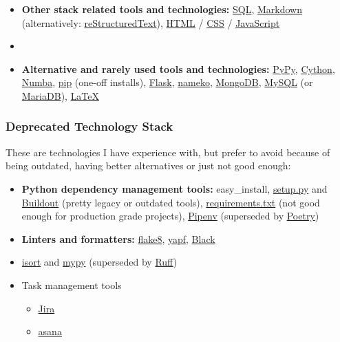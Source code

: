 \documentclass[a4paper,8pt]{extarticle}
\begin{document}
\begin{itemize}
    \item \textbf{Other stack related tools and technologies:} \href{https://en.wikipedia.org/wiki/SQL}{SQL}, \href{https://www.markdownguide.org/}{Markdown} (alternatively: \href{https://docutils.sourceforge.io/rst.html}{reStructuredText}), \href{https://www.w3.org/TR/2011/WD-html5-20110405/}{HTML} / \href{https://www.w3.org/Style/CSS/specs.en.html}{CSS} / \href{https://developer.mozilla.org/en-US/docs/Web/JavaScript}{JavaScript}
    \item \item \textbf{Alternative and rarely used tools and technologies:} \href{https://pypy.org/}{PyPy}, \href{https://cython.org/}{Cython}, \href{https://numba.pydata.org/}{Numba}, \href{https://pypi.org/project/pip/}{pip} (one-off installs), \href{https://flask.palletsprojects.com/}{Flask}, \href{https://www.nameko.io/}{nameko}, \href{https://www.mongodb.com/}{MongoDB}, \href{https://www.mysql.com/}{MySQL} (or \href{https://mariadb.org/}{MariaDB}), \href{https://www.latex-project.org/}{LaTeX}
\end{itemize}
\subsubsection{Deprecated Technology Stack}
These are technologies I have experience with, but prefer to avoid because of being outdated, having better alternatives or just not good enough:
\begin{itemize}
    \item \textbf{Python dependency management tools:} easy\_install, \href{https://packaging.python.org/en/latest/guides/distributing-packages-using-setuptools/#setup-py}{setup.py} and \href{https://www.buildout.org/}{Buildout} (pretty legacy or outdated tools), \href{https://pip.pypa.io/en/stable/reference/requirements-file-format/}{requirements.txt} (not good enough for production grade projects), \href{https://pypi.org/project/pipenv/}{Pipenv} (superseded by \href{https://python-poetry.org/}{Poetry})
    \item \textbf{Linters and formatters:}  \href{https://flake8.pycqa.org/}{flake8}, \href{https://github.com/google/yapf}{yapf}, \href{https://black.readthedocs.io/}{Black} \item \href{https://pycqa.github.io/isort/}{isort} and  \href{https://mypy-lang.org/}{mypy} (superseded by \href{https://docs.astral.sh/ruff/}{Ruff})
\end{itemize}
\begin{itemize}
    \item Task management tools
    \begin{itemize}
        \item \href{https://www.atlassian.com/software/jira}{Jira}
        \item \href{https://asana.com/}{asana}
    \end{itemize}
\end{itemize}
\end{document}
